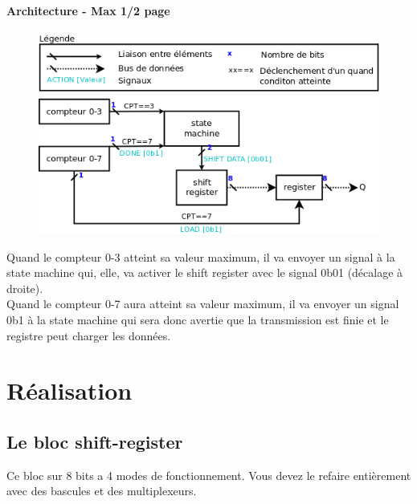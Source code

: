 \documentclass[a4paper]{article} %
\begin{document}
\begin{tcolorbox}[colframe=Monokaimagenta,colback=white]
\paragraph{Architecture - Max 1/2 page}

\begin{figure}[H]
    \centering
    \includegraphics[width=.8\textwidth]{src/schema_bloc.png}
    \label{fig:schem_bloc}
\end{figure}

Quand le compteur 0-3 atteint sa valeur maximum, il va envoyer un signal à la state machine qui, elle, va activer le shift register avec le signal 0b01 (décalage à droite).\\
Quand le compteur 0-7 aura atteint sa valeur maximum, il va envoyer un signal 0b1 à la state machine qui sera donc avertie que la transmission est finie et le registre peut charger les données.

\end{tcolorbox}

\section {Réalisation}
\subsection{Le bloc shift-register}
Ce bloc sur 8 bits a 4 modes de fonctionnement. Vous devez le refaire entièrement avec des bascules et des multiplexeurs.
\end{document}
